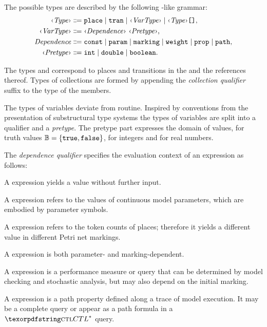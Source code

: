 The possible types are described by the following -like grammar:
\begin{equation}
  \begin{aligned}
    \ebnfVar{Type} &\ebnfEq \lit{place} \mid \lit{tran} \mid \ebnfVar{VarType} \mid \bagtype{\ebnfVar{Type}} \text, \\
    \ebnfVar{VarType} &\ebnfEq \vartype{\ebnfVar{Dependence}}{\ebnfVar{Pretype}} \text,\\
    \rel{Dependence} &\ebnfEq \lit{const} \mid \lit{param} \mid \lit{marking} \mid \lit{weight} \mid \lit{prop} \mid \lit{path} \text, \\
    \ebnfVar{Pretype} &\ebnfEq \lit{int} \mid \lit{double} \mid \lit{boolean} \text.
  \end{aligned} \label{eq:rgspn:type-ebnf}
\end{equation}

The types  and  correspond to places and transitions in the  and the references thereof. Types of collections are formed by appending the \emph{collection qualifier} suffix \lit{[]} to the type of the members.

The types of variables deviate from routine. Inspired by conventions from the presentation of substructural type systems  the types of variables are split into a qualifier and a \emph{pretype}. The pretype part expresses the domain of values,  for truth values \(\mathbb{B} = \{\texttt{\upshape true}, \texttt{\upshape false}\}\),  for integers and  for real numbers.

The \emph{dependence qualifier} specifies the evaluation context of an expression as follows:
\begin{itemize*}
\item A  expression yields a value without further input.
\item A  expression refers to the values of continuous model parameters, which are embodied by parameter symbols.
\item A  expression refers to the token counts of places; therefore it yields a different value in different Petri net markings.
\item A  expression is both parameter- and marking-dependent.
\item A  expression is a performance measure or query that can be determined by model checking and stochastic analysis, but may also depend on the initial marking.
\item A  expression is a path property defined along a trace of model execution. It may be a complete  query or appear as a path formula in a \(\textabbr{CTL}^*\)  query.
\end{itemize*}

